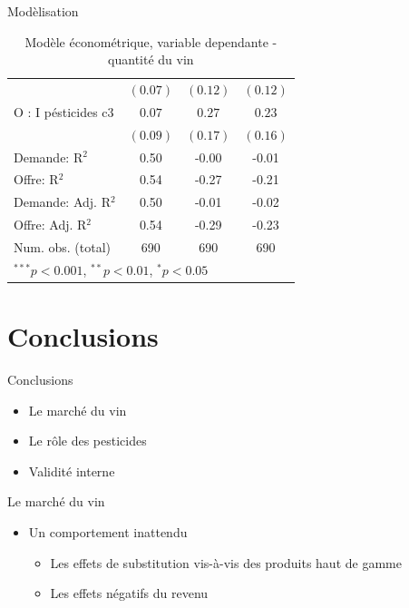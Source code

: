 \documentclass[11pt,ignorenonframetext,]{beamer}
\providecommand{\tightlist}{%
  \setlength{\itemsep}{0pt}\setlength{\parskip}{0pt}}
\begin{document}
\begin{frame}{Modèlisation}
\begin{table}[!htbp]
\begin{center}
\begin{tabular}{l c c c }
                    & $(0.07)$       & $(0.12)$       & $(0.12)$       \\
O : I pésticides c3 & $0.07$         & $0.27$         & $0.23$         \\
                    & $(0.09)$       & $(0.17)$       & $(0.16)$       \\
\hline
Demande: R$^2$      & 0.50           & -0.00          & -0.01          \\
Offre: R$^2$        & 0.54           & -0.27          & -0.21          \\
Demande: Adj. R$^2$ & 0.50           & -0.01          & -0.02          \\
Offre: Adj. R$^2$   & 0.54           & -0.29          & -0.23          \\
Num. obs. (total)   & 690            & 690            & 690            \\
\hline
\multicolumn{4}{l}{\scriptsize{$^{***}p<0.001$, $^{**}p<0.01$, $^*p<0.05$}}
\end{tabular}
\caption{Modèle économétrique, variable dependante - quantité du vin}
\label{table : ols, 2sls et 3sls, full information clusters}
\end{center}
\end{table}

\normalsize

\end{frame}

\hypertarget{conclusions}{%
\section{Conclusions}\label{conclusions}}

\begin{frame}{Conclusions}
\protect\hypertarget{conclusions-1}{}

\begin{itemize}
\tightlist
\item
  Le marché du vin
\item
  Le rôle des pesticides\\
\item
  Validité interne
\end{itemize}

\end{frame}

\begin{frame}{Le marché du vin}
\protect\hypertarget{le-marche-du-vin}{}

\begin{itemize}
\tightlist
\item
  Un comportement inattendu

  \begin{itemize}
  \tightlist
  \item
    Les effets de substitution vis-à-vis des produits haut de gamme
  \item
    Les effets négatifs du revenu
  \end{itemize}
\end{itemize}

\end{frame}
\end{document}
